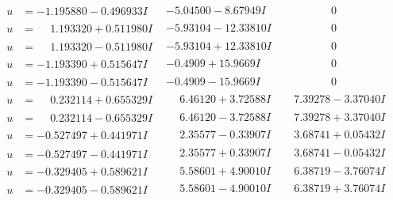 \documentclass[1p]{elsarticle_modified}
\theoremstyle{definition}
\begin{document}
$$\begin{array}{c|c|c}
\begin{aligned}
u &= -1.195880 - 0.496933 I\end{aligned}
 & -5.04500 - 8.67949 I & \phantom{-0.000000 } 0 \\ \hline\begin{aligned}
u &= \phantom{-}1.193320 + 0.511980 I\end{aligned}
 & -5.93104 - 12.33810 I & \phantom{-0.000000 } 0 \\ \hline\begin{aligned}
u &= \phantom{-}1.193320 - 0.511980 I\end{aligned}
 & -5.93104 + 12.33810 I & \phantom{-0.000000 } 0 \\ \hline\begin{aligned}
u &= -1.193390 + 0.515647 I\end{aligned}
 & -0.4909 + 15.9669 I & \phantom{-0.000000 } 0 \\ \hline\begin{aligned}
u &= -1.193390 - 0.515647 I\end{aligned}
 & -0.4909 - 15.9669 I & \phantom{-0.000000 } 0 \\ \hline\begin{aligned}
u &= \phantom{-}0.232114 + 0.655329 I\end{aligned}
 & \phantom{-}6.46120 + 3.72588 I & \phantom{-}7.39278 - 3.37040 I \\ \hline\begin{aligned}
u &= \phantom{-}0.232114 - 0.655329 I\end{aligned}
 & \phantom{-}6.46120 - 3.72588 I & \phantom{-}7.39278 + 3.37040 I \\ \hline\begin{aligned}
u &= -0.527497 + 0.441971 I\end{aligned}
 & \phantom{-}2.35577 - 0.33907 I & \phantom{-}3.68741 + 0.05432 I \\ \hline\begin{aligned}
u &= -0.527497 - 0.441971 I\end{aligned}
 & \phantom{-}2.35577 + 0.33907 I & \phantom{-}3.68741 - 0.05432 I \\ \hline\begin{aligned}
u &= -0.329405 + 0.589621 I\end{aligned}
 & \phantom{-}5.58601 + 4.90010 I & \phantom{-}6.38719 - 3.76074 I \\ \hline\begin{aligned}
u &= -0.329405 - 0.589621 I\end{aligned}
 & \phantom{-}5.58601 - 4.90010 I & \phantom{-}6.38719 + 3.76074 I \\ \hline\begin{aligned}

\end{aligned}
\end{array}$$
\end{document}
